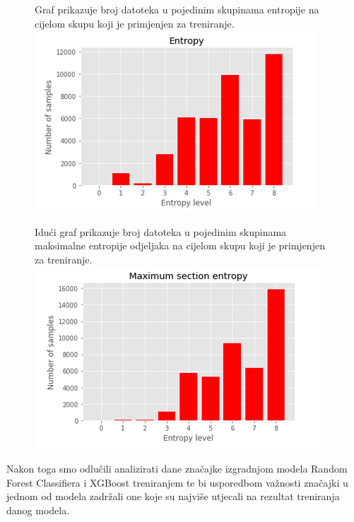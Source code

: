 \documentclass[conference]{IEEEtran}
\begin{document}
\begin{figure}[h]
Graf prikazuje broj datoteka u pojedinim skupinama entropije na cijelom skupu koji je primjenjen za treniranje.
\centering
\includegraphics[scale=0.65]{ent.png}
\end{figure}

\begin{figure}[h]
Idući graf prikazuje broj datoteka u pojedinim skupinama maksimalne entropije odjeljaka na cijelom skupu koji je primjenjen za treniranje.
\centering
\includegraphics[scale=0.65]{ent5.png}
\end{figure}

Nakon toga smo odlučili analizirati dane značajke izgradnjom modela Random Forest Classifiera i XGBoost treniranjem te bi usporedbom važnosti značajki u jednom od modela zadržali one koje su najviše utjecali na rezultat treniranja danog modela.
\end{document}
